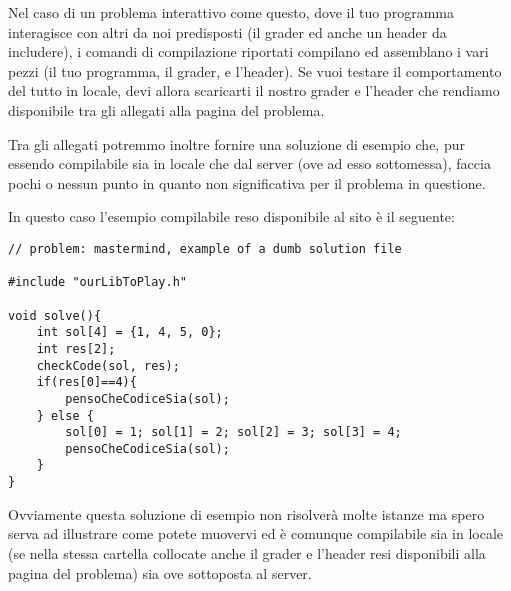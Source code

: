 \documentclass[a4paper,11pt]{article}
\begin{document}
\noindent
  Nel caso di un problema interattivo come questo,
  dove il tuo programma interagisce con altri da noi predisposti
  (il grader ed anche un header da includere), i comandi di compilazione riportati compilano ed assemblano i vari pezzi (il tuo programma, il grader, e l'header).
  Se vuoi testare il comportamento del tutto in locale,
  devi allora scaricarti il nostro grader e l'header che rendiamo disponibile tra gli allegati alla pagina del problema.
  
\noindent
  Tra gli allegati potremmo inoltre fornire una soluzione di esempio che,
  pur essendo compilabile sia in locale che dal server (ove ad esso sottomessa),
  faccia pochi o nessun punto in quanto non significativa per il problema
  in questione.
  
\noindent
  In questo caso l'esempio compilabile reso disponibile al sito \`e il seguente:
\begin{verbatim}
// problem: mastermind, example of a dumb solution file

#include "ourLibToPlay.h"

void solve(){
    int sol[4] = {1, 4, 5, 0};
    int res[2];
    checkCode(sol, res);
    if(res[0]==4){
        pensoCheCodiceSia(sol);    
    } else {
        sol[0] = 1; sol[1] = 2; sol[2] = 3; sol[3] = 4;    
        pensoCheCodiceSia(sol);    
    }
}
\end{verbatim}

\noindent
Ovviamente questa soluzione di esempio non risolver\`a molte istanze
ma spero serva ad illustrare come potete muovervi ed \`e comunque compilabile sia in locale (se nella stessa cartella collocate anche il grader e l'header resi disponibili alla pagina del problema) sia ove sottoposta al server.
  
  
\end{document}
